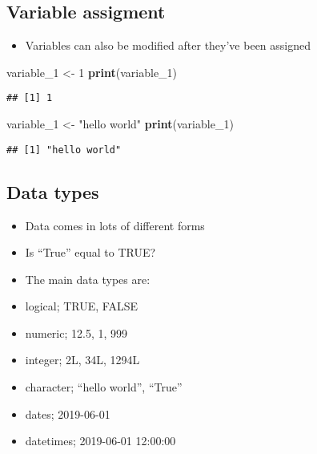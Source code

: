 \documentclass[]{article}
\newenvironment{Shaded}{\begin{snugshade}}{\end{snugshade}}
\newcommand{\KeywordTok}[1]{\textcolor[rgb]{0.13,0.29,0.53}{\textbf{#1}}}
\newcommand{\DecValTok}[1]{\textcolor[rgb]{0.00,0.00,0.81}{#1}}
\newcommand{\StringTok}[1]{\textcolor[rgb]{0.31,0.60,0.02}{#1}}
\newcommand{\NormalTok}[1]{#1}
\providecommand{\tightlist}{%
  \setlength{\itemsep}{0pt}\setlength{\parskip}{0pt}}
\begin{document}
\subsection{Variable assigment}\label{variable-assigment}

\begin{itemize}
\tightlist
\item
  Variables can also be modified after they've been assigned
\end{itemize}

\begin{Shaded}
\begin{Highlighting}[]
\NormalTok{variable_}\DecValTok{1}\NormalTok{ <-}\StringTok{ }\DecValTok{1}
\KeywordTok{print}\NormalTok{(variable_}\DecValTok{1}\NormalTok{)}
\end{Highlighting}
\end{Shaded}

\begin{verbatim}
## [1] 1
\end{verbatim}

\begin{Shaded}
\begin{Highlighting}[]
\NormalTok{variable_}\DecValTok{1}\NormalTok{ <-}\StringTok{ "hello world"}
\KeywordTok{print}\NormalTok{(variable_}\DecValTok{1}\NormalTok{)}
\end{Highlighting}
\end{Shaded}

\begin{verbatim}
## [1] "hello world"
\end{verbatim}

\subsection{Data types}\label{data-types}

\begin{itemize}
\tightlist
\item
  Data comes in lots of different forms
\item
  Is ``True'' equal to TRUE?
\item
  The main data types are:
\item
  logical; TRUE, FALSE
\item
  numeric; 12.5, 1, 999
\item
  integer; 2L, 34L, 1294L
\item
  character; ``hello world'', ``True''
\item
  dates; 2019-06-01
\item
  datetimes; 2019-06-01 12:00:00
\end{itemize}
\end{document}

